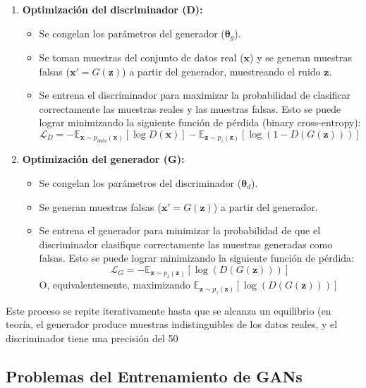 \documentclass{article}
\begin{document}
\begin{enumerate}
    \item \textbf{Optimización del discriminador (D):}
        \begin{itemize}
            \item Se congelan los parámetros del generador (\(\boldsymbol{\theta}_g\)).
            \item Se toman muestras del conjunto de datos real (\(\mathbf{x}\)) y se generan muestras falsas (\(\mathbf{x}' = G(\mathbf{z})\)) a partir del generador, muestreando el ruido \(\mathbf{z}\).
            \item Se entrena el discriminador para maximizar la probabilidad de clasificar correctamente las muestras reales y las muestras falsas.  Esto se puede lograr minimizando la siguiente función de pérdida (binary cross-entropy):
            \[
            \mathcal{L}_D = -\mathbb{E}_{\mathbf{x} \sim p_{data}(\mathbf{x})}[\log D(\mathbf{x})] - \mathbb{E}_{\mathbf{z} \sim p_z(\mathbf{z})}[\log(1 - D(G(\mathbf{z}))) ]
            \]
        \end{itemize}

    \item \textbf{Optimización del generador (G):}
        \begin{itemize}
            \item Se congelan los parámetros del discriminador (\(\boldsymbol{\theta}_d\)).
            \item Se generan muestras falsas (\(\mathbf{x}' = G(\mathbf{z})\)) a partir del generador.
            \item Se entrena el generador para minimizar la probabilidad de que el discriminador clasifique correctamente las muestras generadas como falsas.  Esto se puede lograr minimizando la siguiente función de pérdida:
             \[
            \mathcal{L}_G =  - \mathbb{E}_{\mathbf{z} \sim p_z(\mathbf{z})}[\log(D(G(\mathbf{z}))) ]
            \]
            O, equivalentemente, maximizando  \(\mathbb{E}_{\mathbf{z} \sim p_z(\mathbf{z})}[\log(D(G(\mathbf{z}))) ]\)
        \end{itemize}
\end{enumerate}

Este proceso se repite iterativamente hasta que se alcanza un equilibrio (en teoría, el generador produce muestras indistinguibles de los datos reales, y el discriminador tiene una precisión del 50%

\subsection{Problemas del Entrenamiento de GANs}
\end{document}
